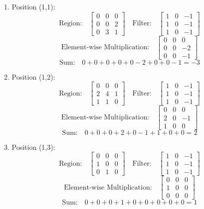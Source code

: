 \documentclass{article}
\begin{document}
1. Position (1,1):
\[
  \text{Region:} \quad \begin{bmatrix} 0 & 0 & 0 \\ 0 & 0 & 2 \\ 0 & 3 & 1 \end{bmatrix} \quad \text{Filter:} \quad \begin{bmatrix} 1 & 0 & -1 \\ 1 & 0 & -1 \\ 1 & 0 & -1 \end{bmatrix}
\]
\[
  \text{Element-wise Multiplication:} \quad \begin{bmatrix} 0 & 0 & 0 \\ 0 & 0 & -2 \\ 0 & 0 & -1 \end{bmatrix}
\]
\[
  \text{Sum:} \quad 0 + 0 + 0 + 0 + 0 - 2 + 0 + 0 - 1 = -3
\]

2. Position (1,2):
\[
  \text{Region:} \quad \begin{bmatrix} 0 & 0 & 0 \\ 2 & 4 & 1 \\ 1 & 1 & 0 \end{bmatrix} \quad \text{Filter:} \quad \begin{bmatrix} 1 & 0 & -1 \\ 1 & 0 & -1 \\ 1 & 0 & -1 \end{bmatrix}
\]
\[
  \text{Element-wise Multiplication:} \quad \begin{bmatrix} 0 & 0 & 0 \\ 2 & 0 & -1 \\ 1 & 0 & 0 \end{bmatrix}
\]
\[
  \text{Sum:} \quad 0 + 0 + 0 + 2 + 0 - 1 + 1 + 0 + 0 = 2
\]

3. Position (1,3):
\[
  \text{Region:} \quad \begin{bmatrix} 0 & 0 & 0 \\ 1 & 0 & 0 \\ 0 & 1 & 0 \end{bmatrix} \quad \text{Filter:} \quad \begin{bmatrix} 1 & 0 & -1 \\ 1 & 0 & -1 \\ 1 & 0 & -1 \end{bmatrix}
\]
\[
  \text{Element-wise Multiplication:} \quad \begin{bmatrix} 0 & 0 & 0 \\ 1 & 0 & 0 \\ 0 & 0 & 0 \end{bmatrix}
\]
\[
  \text{Sum:} \quad 0 + 0 + 0 + 1 + 0 + 0 + 0 + 0 + 0 = 1
\]
\end{document}
